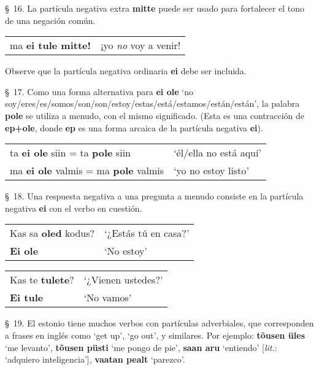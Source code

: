 \S\ 16. La partícula negativa extra \textbf{mitte} puede ser usado para fortalecer el tono de una negación común. 

\begin{center}
\begin{tabular}{ l l }
	ma \textbf{ei tule mitte!} & ¡yo \emph{no} voy a venir!
\end{tabular}	
\end{center}

Observe que la partícula negativa ordinaria \textbf{ei} debe ser incluida.

\S\ 17. Como una forma alternativa para \textbf{ei ole} `no soy/eres/es/somos/son/son/estoy/estas/está/estamos/están/están', la palabra \textbf{pole} se utiliza a menudo, con el mismo significado. (Esta es una contracción de \textbf{ep+ole}, donde \textbf{ep} es una forma arcaica de la partícula negativa \textbf{ei}).

\begin{center}
\begin{tabular}{ l l }
	ta \textbf{ei ole} siin = ta \textbf{pole} siin & `él/ella no está aquí' \\
	ma \textbf{ei ole} valmis = ma \textbf{pole} valmis & `yo no estoy listo' 
\end{tabular}	
\end{center}

\S\ 18. Una respuesta negativa a una pregunta a menudo consiste en la partícula negativa \textbf{ei} con el verbo en cuestión.

\begin{center}
\begin{tabular}{ l l }
	Kas sa \textbf{oled} kodus? & `¿Estás tú en casa?' \\
	\textbf{Ei ole} & `No estoy' \\
\end{tabular}	
\end{center}

\begin{center}
\begin{tabular}{ l l }
	Kas te \textbf{tulete}? & `¿Vienen ustedes?' \\
	\textbf{Ei tule} & `No vamos' \\
\end{tabular}	
\end{center}

\S\ 19. El estonio tiene muchos verbos con partículas adverbiales, que corresponden a frases en inglés como `get up', `go out', y similares. Por ejemplo: \textbf{tõusen üles} `me levanto', \textbf{tõusen püsti} `me pongo de pie', \textbf{saan aru} `entiendo' [\emph{lit.}: `adquiero inteligencia'], \textbf{vaatan pealt} `parezco'.\\

